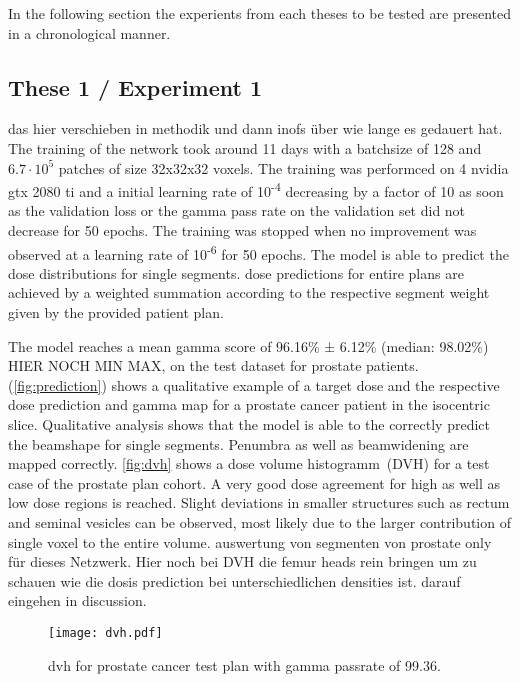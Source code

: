 In the following section the experients from each theses to be tested are presented in a chronological manner.

\subsection{These 1 / Experiment 1}

das hier verschieben in methodik und dann inofs über wie lange es gedauert hat. The training of the network took around 11 days with a batchsize of 128 and $6.7\cdot10^5$ patches of size 32x32x32 voxels. The training was performced on 4 nvidia gtx 2080 ti and a initial learning rate of 10\textsuperscript{-4} decreasing by a factor of 10 as soon as the validation loss or the gamma pass rate on the validation set did not decrease for 50 epochs. The training was stopped when no improvement was observed at a learning rate of 10\textsuperscript{-6} for 50 epochs. 
The model is able to predict the dose distributions for single segments. dose predictions for entire plans are achieved by a weighted summation according to the respective segment weight given by the provided patient plan. 

The model reaches a mean gamma score of 96.16\% ± 6.12\% (median: 98.02\%) HIER NOCH MIN MAX, on the test dataset for prostate patients. (\autoref{fig:prediction}) shows a qualitative example of a target dose and the respective dose prediction and gamma map for a prostate cancer patient in the isocentric slice. Qualitative analysis shows that the model is able to the correctly predict the beamshape for single segments. Penumbra as well as beamwidening are mapped correctly. 
\autoref{fig:dvh} shows a dose volume histogramm~(DVH) for a test case of the prostate plan cohort. A very good dose agreement for high as well as low dose regions is reached. Slight deviations in smaller structures such as rectum and seminal vesicles can be observed, most likely due to the larger contribution of single voxel to the entire volume. auswertung von segmenten von prostate only für dieses Netzwerk. Hier noch bei DVH die femur heads rein bringen um zu schauen wie die dosis prediction bei unterschiedlichen densities ist. darauf eingehen in discussion. 

\begin{figure}
    \centering
    \texttt{[image: dvh.pdf]}
    \caption{dvh for prostate cancer test plan with gamma passrate of 99.36.}\label{fig:dvh}
\end{figure}

